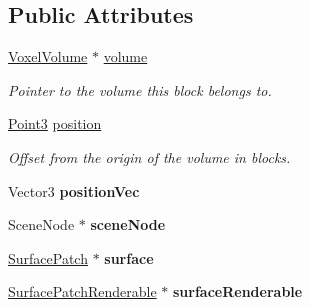 \subsection*{\-Public \-Attributes}
\begin{DoxyCompactItemize}
\item 
\hypertarget{classVoxelBlockPersistent_a35ad2d41377b5e9a63718f5366c52cc7}{
\hyperlink{classVoxelVolume}{\-Voxel\-Volume} $\ast$ \hyperlink{classVoxelBlockPersistent_a35ad2d41377b5e9a63718f5366c52cc7}{volume}}
\label{dd/d36/classVoxelBlockPersistent_a35ad2d41377b5e9a63718f5366c52cc7}

\begin{DoxyCompactList}\small\item\em \-Pointer to the volume this block belongs to. \end{DoxyCompactList}\item 
\hypertarget{classVoxelBlockPersistent_a56978bb0e5182ac9e95c47adddd39ae1}{
\hyperlink{classPoint3}{\-Point3} \hyperlink{classVoxelBlockPersistent_a56978bb0e5182ac9e95c47adddd39ae1}{position}}
\label{dd/d36/classVoxelBlockPersistent_a56978bb0e5182ac9e95c47adddd39ae1}

\begin{DoxyCompactList}\small\item\em \-Offset from the origin of the volume in blocks. \end{DoxyCompactList}\item 
\hypertarget{classVoxelBlockPersistent_a8f427bbd446c20bb83f4309724de439f}{
\-Vector3 {\bfseries position\-Vec}}
\label{dd/d36/classVoxelBlockPersistent_a8f427bbd446c20bb83f4309724de439f}

\item 
\hypertarget{classVoxelBlockPersistent_af43f2aeb3606d2618d4c69d27cf75755}{
\-Scene\-Node $\ast$ {\bfseries scene\-Node}}
\label{dd/d36/classVoxelBlockPersistent_af43f2aeb3606d2618d4c69d27cf75755}

\item 
\hypertarget{classVoxelBlockPersistent_a638baae740949b9d61850519999cba2b}{
\hyperlink{classSurfacePatch}{\-Surface\-Patch} $\ast$ {\bfseries surface}}
\label{dd/d36/classVoxelBlockPersistent_a638baae740949b9d61850519999cba2b}

\item 
\hypertarget{classVoxelBlockPersistent_a0d07369ee574b7a8480a517255ab2bd1}{
\hyperlink{classSurfacePatchRenderable}{\-Surface\-Patch\-Renderable} $\ast$ {\bfseries surface\-Renderable}}
\label{dd/d36/classVoxelBlockPersistent_a0d07369ee574b7a8480a517255ab2bd1}

\end{DoxyCompactItemize}
